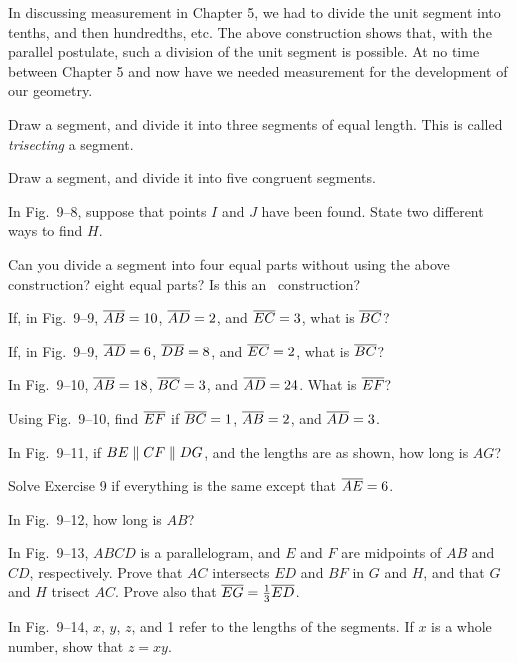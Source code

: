 \documentclass[11pt]{book}
\begin{document}
\begin{remark}
In discussing measurement in Chapter 5, we had to divide the unit segment into
tenths, and then hundredths, etc. The above construction shows that, with the
parallel postulate, such a division of the unit segment is possible. At no time
between Chapter 5 and now have we needed measurement for the development of our
geometry.
\end{remark}

\begin{exercisecols}
\begin{exlist}
\item Draw a segment, and divide it into three segments of equal length. This is
      called \emph{trisecting} a segment.
\item Draw a segment, and divide it into five congruent segments.
\item In Fig.~9--8, suppose that points $I$ and $J$ have been found. State two
      different ways to find $H$.
\item Can you divide a segment into four equal parts without using the above
      construction? eight equal parts? Is this an \RC\ construction?
\item If, in Fig.~9--9, $\overline{AB} = 10$, $\overline{AD} = 2$, and $\overline{EC} = 3$, what is
      $\overline{BC}$?
\exfig{\FIGIXNINE}
\item If, in Fig.~9--9, $\overline{AD} = 6$, $\overline{DB} = 8$, and $\overline{EC} = 2$, what is
      $\overline{BC}$?
\item In Fig.~9--10, $\overline{AB} = 18$, $\overline{BC} = 3$, and $\overline{AD} = 24$. What is
      $\overline{EF}$?
\exfig{\FIGIXTEN}
\item Using Fig.~9--10, find $\overline{EF}$ if $\overline{BC} = 1$, $\overline{AB} = 2$, and
      $\overline{AD} = 3$.
\item In Fig.~9--11, if $BE \mathrel{\|} CF \mathrel{\|} DG$, and the lengths are as shown, how
      long is $AG$?
\exfig{\FIGIXELEVEN}
\item Solve Exercise 9 if everything is the same except that $\overline{AE} = 6$.
\item In Fig.~9--12, how long is $AB$?
\exfig{\FIGIXTWELVE}
\item[\stex 12.] In Fig.~9--13, $ABCD$ is a parallelogram, and $E$ and $F$ are
      midpoints of $AB$ and $CD$, respectively. Prove that $AC$ intersects $ED$
      and $BF$ in $G$ and $H$, and that $G$ and $H$ trisect $AC$. Prove also that
      $\overline{EG} = \frac{1}{3}\overline{ED}$.
\exfig{\FIGIXTHIRTEEN}
\item[\stex 13.] In Fig.~9--14, $x$, $y$, $z$, and 1 refer to the lengths of the
      segments. If $x$ is a whole number, show that $z = xy$.
\exfig{\FIGIXFOURTEEN}
\end{exlist}
\end{exercisecols}
\end{document}
